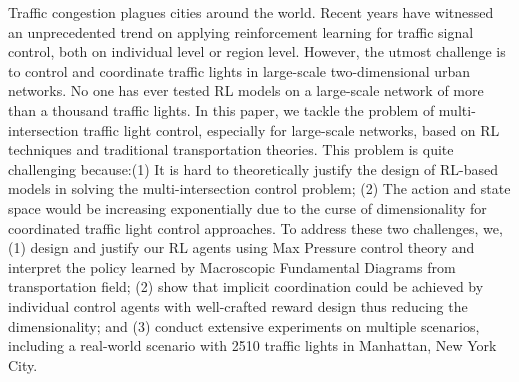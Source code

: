 \begin{englishabstract}
Traffic congestion plagues cities around the world. Recent years have witnessed an unprecedented trend on applying reinforcement learning for traffic signal control, both on individual level or region level. However, the utmost challenge is to control and coordinate traffic lights in large-scale two-dimensional urban networks. No one has ever tested RL models on a large-scale network of more than a thousand traffic lights. In this paper, we tackle the problem of multi-intersection traffic light control, especially for large-scale networks, based on RL techniques and traditional transportation theories. This problem is quite challenging because:(1) It is hard to theoretically justify the design of RL-based models in solving the multi-intersection control problem; (2) The action and state space would be increasing exponentially due to the curse of dimensionality for coordinated traffic light control approaches. To address these two challenges, we, (1) design and justify our RL agents using Max Pressure control theory and interpret the policy learned by Macroscopic Fundamental Diagrams from transportation field; (2) show that implicit coordination could be achieved by individual control agents with well-crafted reward design thus reducing the dimensionality; and (3) conduct extensive experiments on multiple scenarios, including a real-world scenario with 2510 traffic lights in Manhattan, New York City.

\end{englishabstract}

